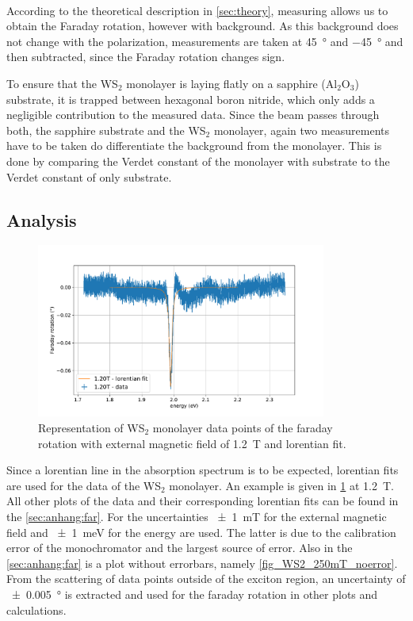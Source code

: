 \

According to the theoretical description in \cref{sec:theory}, measuring allows us to obtain the Faraday rotation, however with background.
As this background does not change with the polarization, measurements are taken at \SI{+45}{\degree} and \SI{-45}{\degree} and then subtracted, since the Faraday rotation changes sign.

To ensure that the WS$_2$ monolayer is laying flatly on a sapphire ($\text{Al}_2\text{O}_3$) substrate, it is trapped between hexagonal boron nitride, which only adds a negligible contribution to the measured data.
Since the beam passes through both, the sapphire substrate and the WS$_2$ monolayer, again two measurements have to be taken do differentiate the background from the monolayer.
This is done by comparing the Verdet constant of the monolayer with substrate to the Verdet constant of only substrate.

\subsection{Analysis}

\begin{figure}[!ht]
    \centering
    \includegraphics[width=0.85\textwidth]{plots/WS2_1200mT.pdf}
    \caption{Representation of WS$_2$ monolayer data points of the faraday rotation with external magnetic field of \SI{1.2}{\tesla} and lorentian fit.}
    \label{fig_WS2_1200mT}
\end{figure}
Since a lorentian line in the absorption spectrum is to be expected, lorentian fits are used for the data of the WS$_2$ monolayer.
An example is given in \cref{fig_WS2_1200mT} at \SI{1.2}{\tesla}.
All other plots of the data and their corresponding lorentian fits can be found in the \cref{sec:anhang:far}.
For the uncertainties \SI{+-1}{\milli\tesla} for the external magnetic field and \SI{+-1}{\milli\electronvolt} for the energy are used.
The latter is due to the calibration error of the monochromator and the largest source of error.
Also in the \cref{sec:anhang:far} is a plot without errorbars, namely \cref{fig_WS2_250mT_noerror}.
From the scattering of data points outside of the exciton region, an uncertainty of \SI{+-0.005}{\degree} is extracted and used for the faraday rotation in other plots and calculations.

